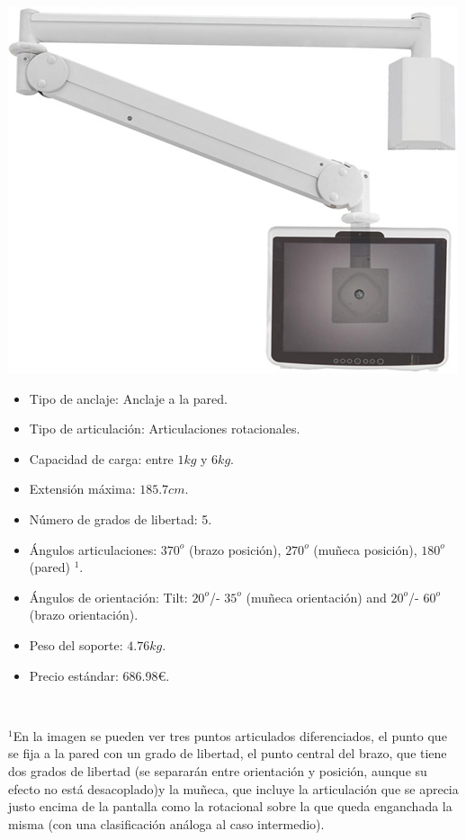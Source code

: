 \begin{minipage}{0.35\textwidth}
	\includegraphics[width=\linewidth]{figuras/Imagenes_EstadoArte/Cotytech_MW-M13P.jpg}
\end{minipage}
\begin{minipage}{0.65\textwidth}\raggedright
	\hspace{1cm}
	\begin{itemize}
		\item Tipo de anclaje: Anclaje a la pared.
		\item Tipo de articulación: Articulaciones rotacionales.
		\item Capacidad de carga: entre $1kg$ y $6kg$.
		\item Extensión máxima: $185.7cm$.
		\item Número de grados de libertad: 5.
		\item Ángulos articulaciones: $370^o$ (brazo posición), $270^o$ (muñeca posición), $180^o$ (pared) $^1$. %
		\item Ángulos de orientación: Tilt: $20^o$/- $35^o$ (muñeca orientación) and $20^o$/- $60^o$ (brazo orientación).
		\item Peso del soporte: $4.76 kg$.
		\item Precio estándar: 686.98\euro.
	\end{itemize}
\end{minipage}
\\

\begin{center}
\begin{minipage}{1\textwidth}
	\footnotesize{$^1$En la imagen se pueden ver tres puntos articulados diferenciados, el punto que se fija a la pared con un grado de libertad, el punto central del brazo, que tiene dos grados de libertad (se separarán entre orientación y posición, aunque su efecto no está desacoplado)y la muñeca, que incluye la articulación que se aprecia justo encima de la pantalla como la rotacional sobre la que queda enganchada la misma (con una clasificación análoga al caso intermedio).}
\end{minipage}
\end{center}
 
